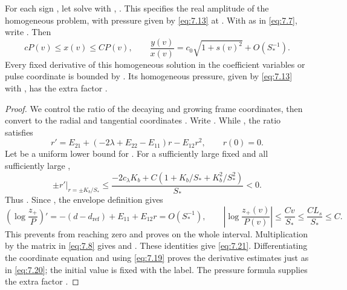 \begin{lemma}\label{lem:7.4}
For each sign , let
 solve
 with
, . This
specifies the real amplitude of the homogeneous 
problem, with pressure given by \eqref{eq:7.13} at
. With
 as in \eqref{eq:7.7}, write
. Then
\begin{equation}
  cP(v)\leq x(v)\leq CP(v),
  \qquad
  \frac{y(v)}{x(v)}=c_0\sqrt{1+s(v)^2}+O(S_*^{-1}).
  \tag{7.21}\label{eq:7.21}
\end{equation}
Every fixed derivative of this homogeneous solution in the coefficient
variables or pulse coordinate is bounded by
. Its homogeneous pressure, given by
\eqref{eq:7.13} with , has the extra factor
.
\end{lemma}
%
\begin{proof}
We control the ratio of the decaying and growing frame coordinates, then
convert to the radial and tangential coordinates .
Write . While
, the ratio
 satisfies
\[
  r'=E_{21}+(-2\lambda+E_{22}-E_{11})r-E_{12}r^2,
  \qquad r(0)=0.
\]
Let  be a uniform lower bound for
. For a sufficiently large fixed
 and all sufficiently large
,
\[
  \left.\pm r'\right|_{r=\pm K_b/S_*}
  \leq
  \frac{-2c_\lambda K_b+C(1+K_b/S_*+K_b^2/S_*^2)}{S_*}<0.
\]
Thus . Since
, the envelope definition gives
\[
  \left(\log\frac{z_+}{P}\right)'
  =-(d-d_{\mathrm{ref}})+E_{11}+E_{12}r=O(S_*^{-1}),
  \qquad
  \left|\log\frac{z_+(v)}{P(v)}\right|
  \leq\frac{Cv}{S_*}\leq\frac{CL_s}{S_*}\leq C.
\]
This prevents  from reaching zero and proves
 on the whole interval.
Multiplication by the matrix in \eqref{eq:7.8} gives
 and
. These identities give \eqref{eq:7.21}.
Differentiating the coordinate equation and using \eqref{eq:7.19} proves the
derivative estimates just as in \eqref{eq:7.20}; the initial value
 is fixed with the label. The pressure formula
supplies the extra factor .
\end{proof}

